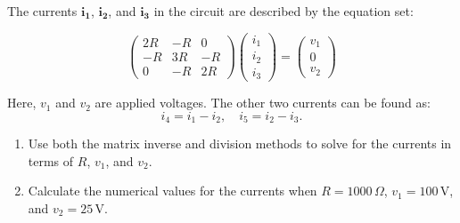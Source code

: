 \documentclass[a4paper, 12pt]{report}
\def\ni{green!60!black!40!white}
\def\link{blue!50!black}
\begin{document}
\begin{tcolorbox}[title={\color{black}\section{Q4}}, colback=white, colframe=\ni, boxrule=1mm, width=1\textwidth]
    The currents \(\mathbf{i_1}\), \(\mathbf{i_2}\), and \(\mathbf{i_3}\) in the circuit are described by the equation set:
    
    \[
    \begin{pmatrix}
        2R & -R & 0 \\
        -R & 3R & -R \\
        0 & -R & 2R
    \end{pmatrix}
    \begin{pmatrix}
        i_1 \\ i_2 \\ i_3
    \end{pmatrix}
    =
    \begin{pmatrix}
        v_1 \\ 0 \\ v_2
    \end{pmatrix}
    \]
    
    Here, \(v_1\) and \(v_2\) are applied voltages. The other two currents can be found as:
    \[
    i_4 = i_1 - i_2, \quad i_5 = i_2 - i_3.
    \]
    
    \begin{enumerate}
        \item Use both the matrix inverse and division methods to solve for the currents in terms of \(R\), \(v_1\), and \(v_2\).
        \item Calculate the numerical values for the currents when \(R = 1000 \, \Omega\), \(v_1 = 100 \, \text{V}\), and \(v_2 = 25 \, \text{V}\).
    \end{enumerate}
\end{tcolorbox}


\end{document}
